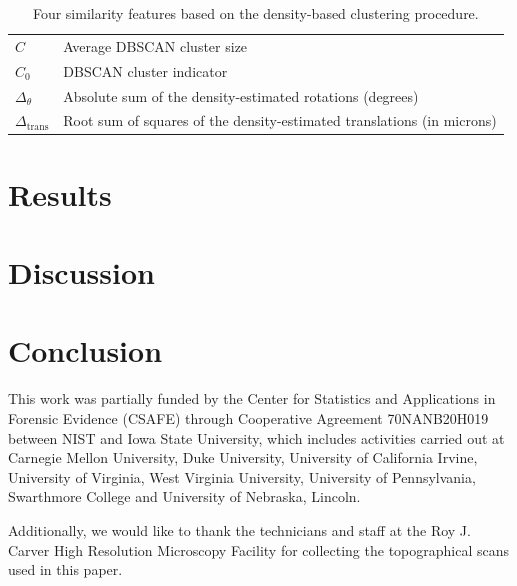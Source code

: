 \documentclass[preprint]{JASA}
\begin{document}
\begin{table}[htbp]
\centering
\begin{tabular}{p{.11\linewidth} p{.7\linewidth}}
$C$ & Average DBSCAN cluster size \\
$C_0$ & DBSCAN cluster indicator \\
$\Delta_\theta$ & Absolute sum of the density-estimated rotations (degrees) \\
$\Delta_{\text{trans}}$ & Root sum of squares of the density-estimated translations (in microns)
\end{tabular}
\caption{Four similarity features based on the density-based clustering procedure.}
\label{tab:dbscanFeatures}
\end{table}

\hypertarget{results}{%
\section{Results}\label{results}}

\hypertarget{discussion}{%
\section{Discussion}\label{discussion}}

\hypertarget{conclusion}{%
\section{Conclusion}\label{conclusion}}

\begin{acknowledgments}
This work was partially funded by the Center for Statistics and
Applications in Forensic Evidence (CSAFE) through Cooperative Agreement
70NANB20H019 between NIST and Iowa State University, which includes
activities carried out at Carnegie Mellon University, Duke University,
University of California Irvine, University of Virginia, West Virginia
University, University of Pennsylvania, Swarthmore College and
University of Nebraska, Lincoln.

Additionally, we would like to thank the technicians and staff at the
Roy J. Carver High Resolution Microscopy Facility for collecting the
topographical scans used in this paper.

\end{acknowledgments}

\appendix

\end{document}
